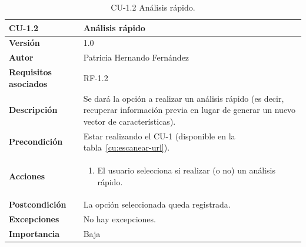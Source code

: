 \begin{table}[p]
	\centering
	\begin{tabularx}{\linewidth}{ p{} p{} }
		\toprule
		\textbf{CU-1.2}    & \textbf{Análisis rápido}\\
		\toprule
		\textbf{Versión}              & 1.0   \\
		\textbf{Autor}                & Patricia Hernando Fernández \\
		\textbf{Requisitos asociados} & RF-1.2 \\
		\textbf{Descripción}          & Se dará la opción a realizar un análisis rápido (es decir, recuperar información previa en lugar de generar un nuevo vector de características). \\
		\textbf{Precondición}         & Estar realizando el CU-1 (disponible en la tabla~\ref{cu:escanear-url}). \\
		\textbf{Acciones}             &
		\begin{enumerate}
			\def\labelenumi{\arabic{enumi}.}
			\tightlist
			\item El usuario selecciona si realizar (o no) un análisis rápido.
		\end{enumerate}\\
		\textbf{Postcondición}        & La opción seleccionada queda registrada. \\
		\textbf{Excepciones}          & No hay excepciones. \\
		\textbf{Importancia}          & Baja \\
		\bottomrule
	\end{tabularx}
	\caption{CU-1.2 Análisis rápido.}
	\label{cu:analisis-rapido}
\end{table}


